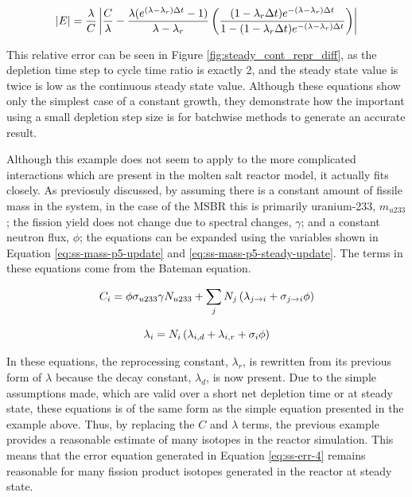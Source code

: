 \begin{equation} \hfill
|E| = \frac{\lambda}{C} \left| \frac{C}{\lambda}  - \frac{\lambda (e^{(\lambda - \lambda_r) \Delta t} - 1)}{\lambda - \lambda_r}  \left( \frac{(1 - \lambda_r \Delta t) e^{-(\lambda - \lambda_r) \Delta t}}{1 - (1 - \lambda_r \Delta t) e^{-(\lambda - \lambda_r) \Delta t}} \right) \right|
\hfill\label{eq:ss-err-4} \end{equation}

This relative error can be seen in Figure \ref{fig:steady_cont_repr_diff}, as the depletion time step to cycle time ratio is exactly 2, and the steady state value is twice is low as the continuous steady state value. Although these equations show only the simplest case of a constant growth, they demonstrate how the important using a small depletion step size is for batchwise methods to generate an accurate result.

Although this example does not seem to apply to the more complicated interactions which are present in the molten salt reactor model, it actually fits closely. As previosuly discussed, by assuming there is a constant amount of fissile mass in the system, in the case of the MSBR this is primarily uranium-233, $m_{u233}$; the fission yield does not change due to spectral changes, $\gamma$; and a constant neutron flux, $\phi$; the equations can be expanded using the variables shown in Equation \eqref{eq:ss-mass-p5-update} and \eqref{eq:ss-mass-p5-steady-update}. The terms in these equations come from the Bateman equation.

\begin{equation} \hfill
C_i = \phi \sigma_{u233} \gamma N_{u233} + \sum_j N_j \left( \lambda_{j \rightarrow i }  + \sigma_{j \rightarrow i} \phi \right)
\hfill\label{eq:ss-mass-p5-update} \end{equation}

\begin{equation} \hfill
\lambda_i = N_i \left( \lambda_{i, d} + \lambda_{i, r} + \sigma_i \phi \right)
\hfill\label{eq:ss-mass-p5-steady-update} \end{equation}

In these equations, the reprocessing constant, $\lambda_r$, is rewritten from its previous form of $\lambda$ because the decay constant, $\lambda_d$, is now present.
Due to the simple assumptions made, which are valid over a short net depletion time or at steady state, these equations is of the same form as the simple equation presented in the example above.
Thus, by replacing the $C$ and $\lambda$ terms, the previous example provides a reasonable estimate of many isotopes in the reactor simulation.
This means that the error equation generated in Equation \eqref{eq:ss-err-4} remains reasonable for many fission product isotopes generated in the reactor at steady state.

